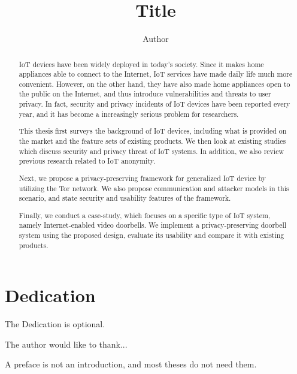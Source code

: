 \documentclass[12pt]{report}
\title{Title}
\author{Author}
\begin{document}

\maketitle    %

\begin{abstract}

IoT devices have been widely deployed in today's society. Since it makes home appliances able to connect to the Internet, IoT services have made daily life much more convenient. However, on the other hand, they have also made home appliances open to the public on the Internet, and thus introduce vulnerabilities and threats to user privacy. In fact, security and privacy incidents of IoT devices have been reported every year, and it has become a increasingly serious problem for researchers.

This thesis first surveys the background of IoT devices, including what is provided on the market and the feature sets of existing products. We then look at existing studies which discuss security and privacy threat of IoT systems. In addition, we also review previous research related to IoT anonymity.

Next, we propose a privacy-preserving framework for generalized IoT device by utilizing the Tor network. We also propose communication and attacker models in this scenario, and state security and usability features of the framework.

Finally, we conduct a case-study, which focuses on a specific type of IoT system, namely Internet-enabled video doorbells. We implement a privacy-preserving doorbell system using the proposed design, evaluate its usability and compare it with existing products.

\end{abstract}


\chapter*{Dedication}

The Dedication is optional.



The author would like to thank...



A preface is not an introduction, and most theses do not need them.
\end{document}
